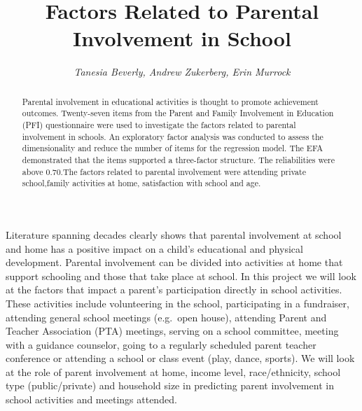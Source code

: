 \documentclass[
  12pt,
]{article}
\title{\textbf{Factors Related to Parental Involvement in School}}
\author{\emph{Tanesia Beverly, Andrew Zukerberg, Erin Murrock}}
\date{}
\begin{document}
\maketitle
\begin{abstract}
\singlespacing Parental involvement in educational activities is thought
to promote achievement outcomes. Twenty-seven items from the Parent and
Family Involvement in Education (PFI) questionnaire were used to
investigate the factors related to parental involvement in schools. An
exploratory factor analysis was conducted to assess the dimensionality
and reduce the number of items for the regression model. The EFA
demonstrated that the items supported a three-factor structure. The
reliabilities were above 0.70.The factors related to parental
involvement were attending private school,family activities at home,
satisfaction with school and age.
\end{abstract}

\newline

Literature spanning decades clearly shows that parental involvement at
school and home has a positive impact on a child's educational and
physical development. Parental involvement can be divided into
activities at home that support schooling and those that take place at
school. In this project we will look at the factors that impact a
parent's participation directly in school activities. These activities
include volunteering in the school, participating in a fundraiser,
attending general school meetings (e.g.~open house), attending Parent
and Teacher Association (PTA) meetings, serving on a school committee,
meeting with a guidance counselor, going to a regularly scheduled parent
teacher conference or attending a school or class event (play, dance,
sports). We will look at the role of parent involvement at home, income
level, race/ethnicity, school type (public/private) and household size
in predicting parent involvement in school activities and meetings
attended.
\end{document}

